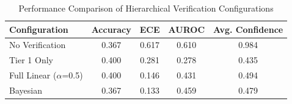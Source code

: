 \begin{table}[h]
\centering
\caption{Performance Comparison of Hierarchical Verification Configurations}
\label{tab:paper1_results}
\begin{tabular}{lcccc}
\hline
Configuration & Accuracy & ECE & AUROC & Avg. Confidence \\
\hline
No Verification & 0.367 & 0.617 & 0.610 & 0.984 \\
Tier 1 Only & 0.400 & 0.281 & 0.278 & 0.435 \\
Full Linear ($\alpha$=0.5) & 0.400 & 0.146 & 0.431 & 0.494 \\
Bayesian & 0.367 & 0.133 & 0.459 & 0.479 \\
\hline
\end{tabular}
\end{table}